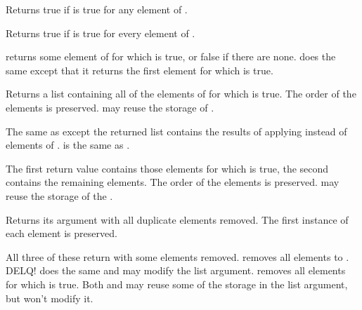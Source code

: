 \begin{protos}
\end{protos}
Returns true if  is true for any element of .

\begin{protos}
\end{protos}
  Returns true if  is true for every element of .

\begin{protos}
\end{protos}
 returns some element of  for which  is true, or
false if there are none.   does the same except that it returns
the first element for which  is true.

\begin{protos}
\end{protos}
Returns a list containing all of the elements of  for which
 is true.  The order of the elements is preserved.
 may reuse the storage of .

\begin{protos}
\end{protos}
The same as  except the returned list contains the results of
applying  instead of elements of .   is the same as .

\begin{protos}
\end{protos}
The first return value contains those elements  for which
 is true, the second contains the remaining elements.
The order of the elements is preserved.   may
reuse the storage of the .

\begin{protos}
\end{protos}
Returns its argument with all duplicate elements removed.  The first
instance of each element is preserved.

\begin{protos}
\end{protos}
All three of these return  with some elements removed.
 removes all elements  to .  DELQ!
does the same and may modify the list argument.   removes
all elements for which  is true.  Both  and
 may reuse some of the storage in the list argument, but
won't modify it.

